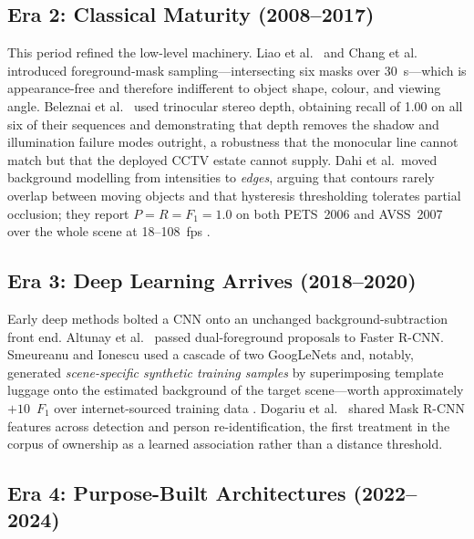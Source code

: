 \documentclass[10pt,twocolumn,a4paper]{article}
\begin{document}
\subsection{Era 2: Classical Maturity (2008--2017)}

This period refined the low-level machinery. Liao et al.\ \cite{liao2008} and Chang et al.\ \cite{chang2010}
introduced foreground-mask sampling---intersecting six masks over 30~s---which is
appearance-free and therefore indifferent to object shape, colour, and viewing
angle.
Beleznai et al.\ \cite{beleznai2013} used trinocular stereo depth, obtaining recall
of 1.00 on all six of their sequences and demonstrating that depth removes the
shadow and illumination failure modes outright, a robustness that the monocular line cannot match but that the deployed CCTV
estate cannot supply. Dahi et al.\ moved background modelling from
intensities to \emph{edges}, arguing that contours rarely overlap between moving
objects and that hysteresis thresholding tolerates partial occlusion; they report
$P=R=F_1=1.0$ on both PETS~2006 and AVSS~2007 over the whole scene at 18--108~fps
\cite{dahi2017}.

\subsection{Era 3: Deep Learning Arrives (2018--2020)}

Early deep methods bolted a CNN onto an unchanged background-subtraction front
end. Altunay et al.\ \cite{altunay2018} passed
dual-foreground proposals to Faster R-CNN. Smeureanu
and Ionescu used a cascade of two GoogLeNets and, notably, generated
\emph{scene-specific synthetic training samples} by superimposing template luggage
onto the estimated background of the target scene---worth approximately
$+10$~$F_1$ over internet-sourced training data \cite{smeureanu2018}. Dogariu et
al.\ \cite{dogariu2020} shared Mask R-CNN features across detection and person
re-identification, the first treatment in the corpus of ownership as a learned
association rather than a distance threshold.

\subsection{Era 4: Purpose-Built Architectures (2022--2024)}
\end{document}
